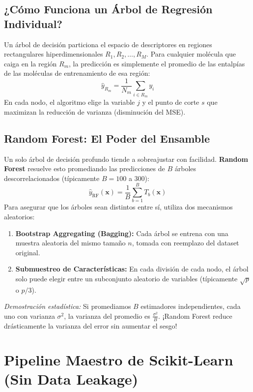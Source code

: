 \documentclass[11pt,letterpaper]{report}
\begin{document}
\subsection{¿Cómo Funciona un Árbol de Regresión Individual?}
Un árbol de decisión particiona el espacio de descriptores en regiones rectangulares hiperdimensionales $R_1, R_2, \dots, R_M$. Para cualquier molécula que caiga en la región $R_m$, la predicción es simplemente el promedio de las entalpías de las moléculas de entrenamiento de esa región:
\begin{equation}
    \hat{y}_{R_m} = \frac{1}{N_m} \sum_{i \in R_m} y_i
\end{equation}
En cada nodo, el algoritmo elige la variable $j$ y el punto de corte $s$ que maximizan la reducción de varianza (disminución del MSE).

\subsection{Random Forest: El Poder del Ensamble}
Un solo árbol de decisión profundo tiende a sobreajustar con facilidad. \textbf{Random Forest} resuelve esto promediando las predicciones de $B$ árboles descorrelacionados (típicamente $B = 100$ a $300$):
\begin{equation}
    \hat{y}_{\text{RF}}(\mathbf{x}) = \frac{1}{B} \sum_{b=1}^B T_b(\mathbf{x})
\end{equation}
Para asegurar que los árboles sean distintos entre sí, utiliza dos mecanismos aleatorios:
\begin{enumerate}[leftmargin=*]
    \item \textbf{Bootstrap Aggregating (Bagging):} Cada árbol se entrena con una muestra aleatoria del mismo tamaño $n$, tomada con reemplazo del dataset original.
    \item \textbf{Submuestreo de Características:} En cada división de cada nodo, el árbol solo puede elegir entre un subconjunto aleatorio de variables (típicamente $\sqrt{p}$ o $p/3$).
\end{enumerate}
\textit{Demostración estadística:} Si promediamos $B$ estimadores independientes, cada uno con varianza $\sigma^2$, la varianza del promedio es $\frac{\sigma^2}{B}$. ¡Random Forest reduce drásticamente la varianza del error sin aumentar el sesgo!

\section{Pipeline Maestro de Scikit-Learn (Sin Data Leakage)}
\end{document}
